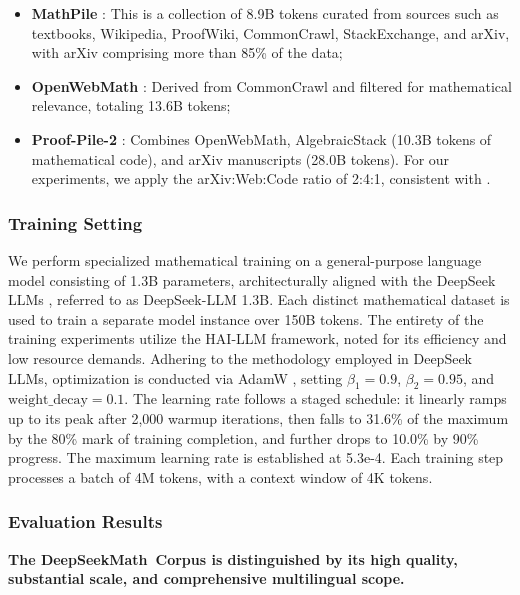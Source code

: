 \begin{itemize}[topsep=0pt]
    \item \textbf{MathPile} \citep{mathpile}: This is a collection of 8.9B tokens curated from sources such as textbooks, Wikipedia, ProofWiki, CommonCrawl, StackExchange, and arXiv, with arXiv comprising more than 85\% of the data;
    \item \textbf{OpenWebMath} \citep{openwebmath}: Derived from CommonCrawl and filtered for mathematical relevance, totaling 13.6B tokens;
    \item \textbf{Proof-Pile-2} \citep{llemma}: Combines OpenWebMath, AlgebraicStack (10.3B tokens of mathematical code), and arXiv manuscripts (28.0B tokens). For our experiments, we apply the arXiv:Web:Code ratio of 2:4:1, consistent with \cite{llemma}.
\end{itemize}

\subsubsection{Training Setting}
\label{sec:quality-policy}
We perform specialized mathematical training on a general-purpose language model consisting of 1.3B parameters, architecturally aligned with the DeepSeek LLMs \citep{deepseek-llm}, referred to as DeepSeek-LLM 1.3B. Each distinct mathematical dataset is used to train a separate model instance over 150B tokens. The entirety of the training experiments utilize the HAI-LLM \citep{haillm} framework, noted for its efficiency and low resource demands. Adhering to the methodology employed in DeepSeek LLMs, optimization is conducted via AdamW \citep{adamW}, setting $\beta_1=0.9$, $\beta_2=0.95$, and $\mathrm{weight\_decay}=0.1$. The learning rate follows a staged schedule: it linearly ramps up to its peak after 2,000 warmup iterations, then falls to 31.6\% of the maximum by the 80\% mark of training completion, and further drops to 10.0\% by 90\% progress. The maximum learning rate is established at 5.3e-4. Each training step processes a batch of 4M tokens, with a context window of 4K tokens.

\subsubsection{Evaluation Results}

\textbf{The DeepSeekMath~Corpus is distinguished by its high quality, substantial scale, and comprehensive multilingual scope.}

